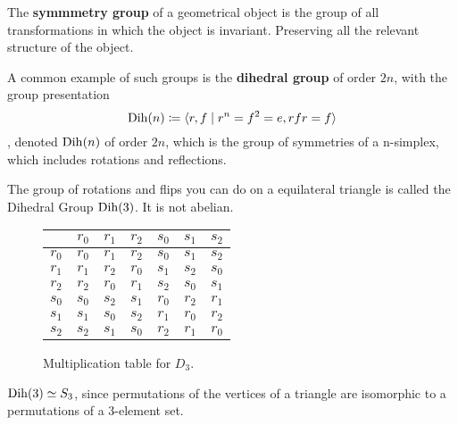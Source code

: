   \begin{definition}
    The \textbf{symmmetry group} of a geometrical object is the group of all transformations in which the object is invariant. Preserving all the relevant structure of the object. 
  \end{definition}

  \begin{definition}
    A common example of such groups is the \textbf{dihedral group} of order $2n$, with the group presentation 
    \begin{equation}
      \operatorname{Dih}(n) \coloneqq \langle r, f \mid r^n = f^2 = e, rfr = f  \rangle
    \end{equation}
    , denoted $\operatorname{Dih}(n)$ of order $2n$, which is the group of symmetries of a n-simplex, which includes rotations and reflections. 
  \end{definition}

  \begin{example}
    The group of rotations and flips you can do on a equilateral triangle is called the Dihedral Group $\operatorname{Dih}(3)$. It is not abelian. 

    \begin{figure}[H]
      \centering 
      \begin{tabular}{|c|c|c|c|c|c|c|}
        \hline
        & $r_0$ & $r_1$ & $r_2$ & $s_0$ & $s_1$ & $s_2$ \\
        \hline
        $r_0$ & $r_0$ & $r_1$ & $r_2$ & $s_0$ & $s_1$ & $s_2$ \\
        \hline
        $r_1$ & $r_1$ & $r_2$ & $r_0$ & $s_1$ & $s_2$ & $s_0$ \\
        \hline
        $r_2$ & $r_2$ & $r_0$ & $r_1$ & $s_2$ & $s_0$ & $s_1$ \\
        \hline
        $s_0$ & $s_0$ & $s_2$ & $s_1$ & $r_0$ & $r_2$ & $r_1$ \\
        \hline
        $s_1$ & $s_1$ & $s_0$ & $s_2$ & $r_1$ & $r_0$ & $r_2$ \\
        \hline
        $s_2$ & $s_2$ & $s_1$ & $s_0$ & $r_2$ & $r_1$ & $r_0$ \\
        \hline
      \end{tabular}
      \caption{Multiplication table for $D_3$. } 
      \label{fig:triangle_d3}
    \end{figure}
  \end{example} 

  \begin{example}
    $\operatorname{Dih}(3) \simeq S_{3}$, since permutations of the vertices of a triangle are isomorphic to a permutations of a 3-element set. 
  \end{example}  

